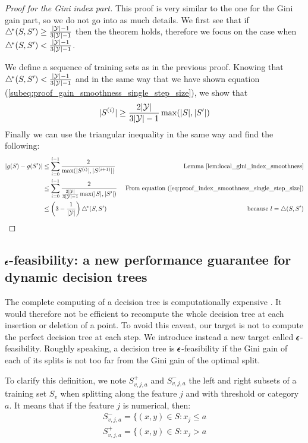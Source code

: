 \begin{proof}[Proof for the Gini index part]
    This proof is very similar to the one for the Gini gain part, so we do not go into as much details. We first see that if $\triangle^{\!*}(S, S') \geq \frac{|\mathcal{Y}|-1}{3|\mathcal{Y}| - 1}$ then the theorem holds, therefore we focus on the case when $\triangle^{\!*}(S, S') < \frac{|\mathcal{Y}|-1}{3|\mathcal{Y}| - 1}$.

    We define a sequence of training sets as in the previous proof. Knowing that $\triangle^{\!*}(S, S') < \frac{|\mathcal{Y}|-1}{3|\mathcal{Y}| - 1}$ and in the same way that we have shown equation (\ref{subeq:proof_gain_smoothness_single_step_size}), we show that 
    \begin{equation}\label{eq:proof_index_smoothness_single_step_size}
        |S^{(i)}| \geq \frac{2|\mathcal{Y}|}{3|\mathcal{Y}| - 1}\max(|S|, |S'|)
    \end{equation}
    Finally we can use the triangular inequality in the same way and find the following:
    \begin{align*}
        |g(S) - g(S')| &\leq \sum_{i=0}^{l-1} \frac{2}{\max(|S^{(i)}|, |S^{(i+1)}|)} & \text{ Lemma \ref{lem:local_gini_index_smoothness}}\\
        &\leq \sum_{i=0}^{l-1} \frac{2}{\frac{2|\mathcal{Y}|}{3|\mathcal{Y}| - 1}\max(|S|, |S'|)} & \text{ From equation (\ref{eq:proof_index_smoothness_single_step_size})}\\
        &\leq \left(3-\frac{1}{|\mathcal{Y}|}\right) \triangle^{\!*}(S,S')& \text{ because $l = \triangle(S, S')$}
    \end{align*}
\end{proof}

\subsection{$\pmb{\epsilon}$-feasibility: a new performance guarantee for dynamic decision trees}

The complete computing of a decision tree is computationally expensive . It would therefore not be efficient to recompute the whole decision tree at each insertion or deletion of a point. To avoid this caveat, our target is not to compute the perfect decision tree at each step. We introduce instead a new target called $\pmb{\epsilon}$-feasibility. Roughly speaking, a decision tree is $\pmb{\epsilon}$-feasibility if the Gini gain of each of its splits is not too far from the Gini gain of the optimal split.

To clarify this definition, we note $S^+_{v, j, a}$ and $S^-_{v, j, a}$ the left and right subsets of a training set $S_v$ when splitting along the feature $j$ and with threshold or category $a$. It means that if the feature $j$ is numerical, then:
\begin{equation}
    \begin{split}
        S^-_{v, j, a} = \{(x, y) \in S : x_j \leq a\\
        S^+_{v, j, a} = \{(x, y) \in S : x_j > a\\
    \end{split}
\end{equation}


